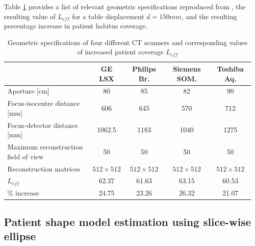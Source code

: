 \documentclass[]{spie}
\begin{document}
Table \ref{tab:scanner_geoms} provides a list of relevant geometric specifications reproduced from  \cite{ImPACTCenterforEvidencebasedPurchasing2009}, the resulting value of $L_{eff}$ for a table displacement $d = 150 mm$, and the resulting percentage increase in patient habitus coverage. 

\begin{table}
\begin{center}
\begin{tabular}{l cccc}
\hline 
\hline 
 & GE LSX & Philips Br. & Siemens SOM.  & Toshiba Aq.  \\ 
\hline 
Aperture [cm]  & 80 & 85 & 82 & 90 \\ 
Focus-isocentre distance [mm]  & 606 & 645 & 570 & 712 \\ 
Focus-detector distance [mm]  & 1062.5 & 1183 & 1040 & 1275 \\ 
Maximum reconstruction field of view & 50 & 50 & 50 & 50 \\ 
Reconstruction matrices  & $512 \times 512$ & $512 \times 512$ & $512 \times 512$ & $512 \times 512$ \\ 
\hline 
$L_{eff}$ & 62.37 & 61.63 & 63.15 & 60.53 \\ 
\% increase & 24.75 & 23.26 & 26.32 & 21.07 \\ 
\hline 
\hline 
\end{tabular} 
\caption{Geometric specifications of four different CT scanners and corresponding values of increased patient coverage $L_{eff}$ \label{tab:scanner_geoms}}
\end{center}
\end{table}
\subsection{Patient shape model estimation using slice-wise ellipse}
\label{ssec:ellipse-estimation}

\end{document}
